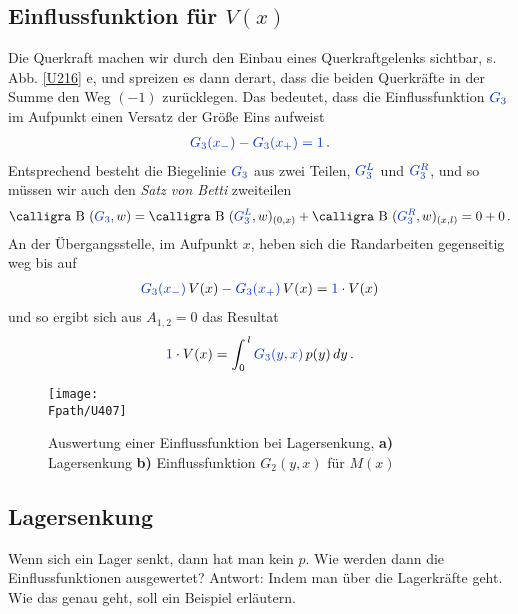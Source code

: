{\textcolor{sectionTitleBlue}{\subsection{Einflussfunktion f\"{u}r $V(x)$}}}
Die Querkraft machen wir durch den Einbau eines Querkraftgelenks sichtbar, s. Abb. \ref{U216} e, und spreizen es dann derart, dass die beiden Querkr\"{a}fte in der Summe den Weg $(-1)$ zur\"{u}cklegen. Das bedeutet, dass die Einflussfunktion $\textcolor{chapterTitleBlue}{G_3}$ im Aufpunkt einen Versatz der Gr\"{o}{\ss}e Eins aufweist
\begin{align}
\textcolor{chapterTitleBlue}{G_3(x_{-}) - G_3(x_+) = 1}\,.
\end{align}
Entsprechend besteht die Biegelinie $\textcolor{chapterTitleBlue}{G_3}$ aus zwei Teilen, $\textcolor{chapterTitleBlue}{G_3^L}$ und $\textcolor{chapterTitleBlue}{G_3^R}$, und so m\"{u}ssen wir auch den {\em Satz von Betti\/} zweiteilen
\begin{align}
\text{\normalfont\calligra B\,\,}(\textcolor{chapterTitleBlue}{G_3},w) = \text{\normalfont\calligra B\,\,}(\textcolor{chapterTitleBlue}{G_3^L},w)_{(0,x)} + \text{\normalfont\calligra B\,\,}(\textcolor{chapterTitleBlue}{G_3^R},w)_{(x,l)} = 0 + 0\,.
\end{align}
An der \"{U}bergangsstelle, im Aufpunkt $x$, heben sich die Randarbeiten gegenseitig weg bis auf
\begin{align}
\textcolor{chapterTitleBlue}{G_3(x_{-})}\,V(x) - \textcolor{chapterTitleBlue}{G_3(x_+)}\,V(x) = \textcolor{chapterTitleBlue}{1} \cdot V(x)
\end{align}
und so ergibt sich aus $A_{1,2} = 0$ das Resultat
\begin{align}
\textcolor{chapterTitleBlue}{1} \cdot V(x) = \int_0^{\,l} \textcolor{chapterTitleBlue}{G_3(y,x)}\,p(y)\,dy\,.
\end{align}
\begin{figure}[tbp]
\centering
\if {} \sidecaption \fi
\texttt{[image: \\Fpath/U407]}
\caption{Auswertung einer Einflussfunktion bei Lagersenkung, \textbf{ a)} Lagersenkung \textbf{ b)} Einflussfunktion $G_2(y,x)$ f\"{u}r $M(x)$} \label{U407}
\end{figure}%

{\textcolor{sectionTitleBlue}{\subsection{Lagersenkung }}}\label{Korrektur18}\label{LagerWeg}
Wenn sich ein Lager senkt, dann hat man kein $p$. Wie werden dann die Einflussfunktionen ausgewertet? Antwort: Indem man \"{u}ber die Lagerkr\"{a}fte geht. Wie das genau geht, soll ein Beispiel erl\"{a}utern.

